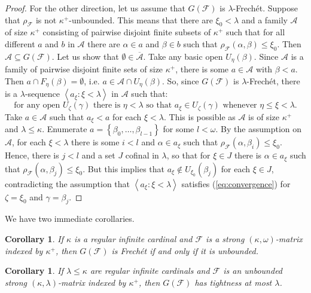 \documentclass{amsart}
\theoremstyle{plain}
\newtheorem{corollary}[theorem]{Corollary}
\theoremstyle{definition}
\numberwithin{equation}{section}
\renewcommand{\a}{\alpha}
\renewcommand{\b}{\beta}
\newcommand{\g}{\gamma}
\renewcommand{\k}{\kappa}
\renewcommand{\o}{\omega}
\renewcommand{\l}{\lambda}
\newcommand{\ps}{\emptyset}
\newcommand{\sst}{\subseteq}
\newcommand{\seq}[1]{\left<#1\right>}
\newcommand{\set}[1]{\left\{#1\right\}}
\begin{document}
\begin{proof}
	For the other direction, let us assume that $G(\mathcal F)$ is $\l$-Frech\'et.
	Suppose that $\rho_{\mathcal F}$ is not $\k^+$-unbounded.
	This means that there are $\xi_0<\l$ and a family $\mathcal A$ of size $\k^+$ consisting of pairwise disjoint finite subsets of $\k^+$ such that for all different $a$ and $b$ in $\mathcal A$ there are $\a\in a$ and $\b\in b$ such that $\rho_{\mathcal F}(\a,\b)\le \xi_0$.
	Then $\mathcal A\sst G(\mathcal F)$.
	Let us show that $\ps\in\overline{\mathcal A}$.
	Take any basic open $U_{\eta}(\b)$.
	Since $\mathcal A$ is a family of pairwise disjoint finite sets of size $\k^+$, there is some $a\in \mathcal A$ with $\b<a$.
	Then $a\cap F_{\eta}(\b)=\ps$, i.e. $a\in \mathcal A\cap U_{\eta}(\b)$.
	So, since $G(\mathcal F)$ is $\l$-Frech\'et, there is a $\l$-sequence $\seq{a_{\xi}:\xi<\l}$ in $\mathcal A$ such that: \begin{equation}\label{eq:convergence}\mbox{for any open }U_{\zeta}(\g)\mbox{ there is }\eta<\l\mbox{ so that }a_{\xi}\in U_{\zeta}(\g)\mbox{ whenever }\eta\le\xi<\l.\end{equation}
	Take $a\in \mathcal A$ such that $a_{\xi}<a$ for each $\xi<\l$.
	This is possible as $\mathcal A$ is of size $\k^+$ and $\l\le\k$.
	Enumerate $a=\set{\b_0,\dots,\b_{l-1}}$ for some $l<\o$.
	By the assumption on $\mathcal A$, for each $\xi<\l$ there is some $i<l$ and $\a\in a_{\xi}$ such that $\rho_{\mathcal F}(\a,\b_i)\le \xi_0$.
	Hence, there is $j<l$ and a set $J$ cofinal in $\l$, so that for $\xi\in J$ there is $\a\in a_{\xi}$ such that $\rho_{\mathcal F}(\a,\b_j)\le \xi_0$.
	But this implies that $a_{\xi}\notin U_{\xi_0}(\b_j)$ for each $\xi\in J$, contradicting the assumption that $\seq{a_{\xi}:\xi<\l}$ satisfies (\ref{eq:convergence}) for $\zeta=\xi_0$ and $\g=\b_j$.
\end{proof}

We have two immediate corollaries.

\begin{corollary}
	If $\k$ is a regular infinite cardinal and $\mathcal F$ is a strong $(\k,\o)$-matrix indexed by $\k^+$, then $G(\mathcal F)$ is Frech\'et if and only if it is unbounded.
\end{corollary}

\begin{corollary}
	If $\l\le\k$ are regular infinite cardinals and $\mathcal F$ is an unbounded strong $(\k,\l)$-matrix indexed by $\k^+$, then $G(\mathcal F)$ has tightness at most $\l$.
\end{corollary}
\end{document}
